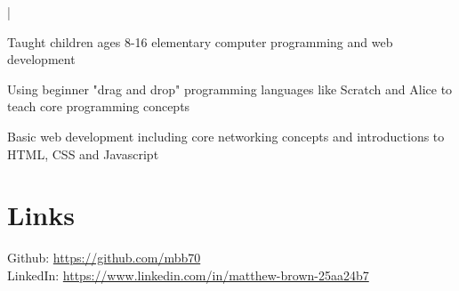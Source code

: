 \documentclass[]{deedy-resume-openfont}
\begin{document}
|
\begin{tightemize}
\item Taught children ages 8-16 elementary computer programming and web development
\item Using beginner "drag and drop" programming languages like Scratch and Alice to teach core programming concepts
\item Basic web development including core networking concepts and introductions to HTML, CSS and Javascript
\end{tightemize}



\section{Links}
Github: \href{https://github.com/mbb70}{https://github.com/mbb70} \\
LinkedIn: \href{https://www.linkedin.com/in/matthew-brown-25aa24b7}{https://www.linkedin.com/in/matthew-brown-25aa24b7}  \\

\vfill

\end{document}
